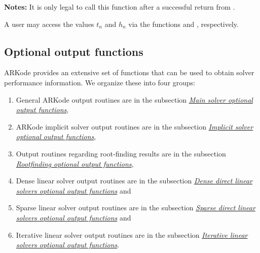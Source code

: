 \documentclass[letterpaper,10pt,english]{sphinxmanual}
\begin{document}
\begin{fulllineitems}
\begin{description}
\begin{itemize}
\end{itemize}

\end{description}

\textbf{Notes:} It is only legal to call this function after a successful
return from {\hyperref[c_interface/User_callable:ARKode]{}}.

A user may access the values $t_n$ and $h_n$ via the
functions {\hyperref[c_interface/User_callable:ARKodeGetCurrentTime]{}} and
{\hyperref[c_interface/User_callable:ARKodeGetLastStep]{}}, respectively.

\end{fulllineitems}



\subsection{Optional output functions}
\label{c_interface/User_callable:optional-output-functions}\label{c_interface/User_callable:cinterface-optionaloutputs}
ARKode provides an extensive set of functions that can be used to
obtain solver performance information.  We organize these into four
groups:
\begin{enumerate}
\item {} 
General ARKode output routines are in the subsection
{\hyperref[c_interface/User_callable:cinterface-arkodemainoutputs]{\emph{Main solver optional output functions}}},

\item {} 
ARKode implicit solver output routines are in the subsection
{\hyperref[c_interface/User_callable:cinterface-arkodeimplicitsolveroutputs]{\emph{Implicit solver optional output functions}}},

\item {} 
Output routines regarding root-finding results are in the subsection
{\hyperref[c_interface/User_callable:cinterface-arkoderootoutputs]{\emph{Rootfinding optional output functions}}},

\item {} 
Dense linear solver output routines are in the subsection
{\hyperref[c_interface/User_callable:cinterface-arkdlsoutputs]{\emph{Dense direct linear solvers optional output functions}}} and

\item {} 
Sparse linear solver output routines are in the subsection
{\hyperref[c_interface/User_callable:cinterface-arkslsoutputs]{\emph{Sparse direct linear solvers optional output functions}}} and

\item {} 
Iterative linear solver output routines are in the subsection
{\hyperref[c_interface/User_callable:cinterface-arkspilsoutputs]{\emph{Iterative linear solvers optional output functions}}}.

\end{enumerate}
\end{document}
